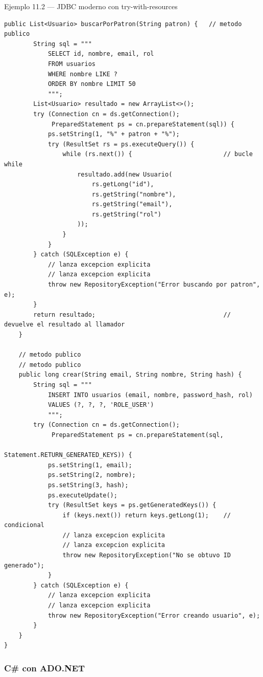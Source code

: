 \documentclass[11pt,a4paper,openany]{book}
\begin{document}
\begin{cajaejemplo}{Ejemplo 11.2 --- JDBC moderno con try-with-resources}
\begin{lstlisting}[style=java,caption={UsuarioJdbcRepository.java},label=lst:11.5]
    public List<Usuario> buscarPorPatron(String patron) {   // metodo publico
        String sql = """
            SELECT id, nombre, email, rol
            FROM usuarios
            WHERE nombre LIKE ?
            ORDER BY nombre LIMIT 50
            """;
        List<Usuario> resultado = new ArrayList<>();
        try (Connection cn = ds.getConnection();
             PreparedStatement ps = cn.prepareStatement(sql)) {
            ps.setString(1, "%" + patron + "%");
            try (ResultSet rs = ps.executeQuery()) {
                while (rs.next()) {                         // bucle while
                    resultado.add(new Usuario(
                        rs.getLong("id"),
                        rs.getString("nombre"),
                        rs.getString("email"),
                        rs.getString("rol")
                    ));
                }
            }
        } catch (SQLException e) {
            // lanza excepcion explicita
            // lanza excepcion explicita
            throw new RepositoryException("Error buscando por patron", e);
        }
        return resultado;                                   // devuelve el resultado al llamador
    }

    // metodo publico
    // metodo publico
    public long crear(String email, String nombre, String hash) {
        String sql = """
            INSERT INTO usuarios (email, nombre, password_hash, rol)
            VALUES (?, ?, ?, 'ROLE_USER')
            """;
        try (Connection cn = ds.getConnection();
             PreparedStatement ps = cn.prepareStatement(sql,
                                       Statement.RETURN_GENERATED_KEYS)) {
            ps.setString(1, email);
            ps.setString(2, nombre);
            ps.setString(3, hash);
            ps.executeUpdate();
            try (ResultSet keys = ps.getGeneratedKeys()) {
                if (keys.next()) return keys.getLong(1);    // condicional
                // lanza excepcion explicita
                // lanza excepcion explicita
                throw new RepositoryException("No se obtuvo ID generado");
            }
        } catch (SQLException e) {
            // lanza excepcion explicita
            // lanza excepcion explicita
            throw new RepositoryException("Error creando usuario", e);
        }
    }
}
\end{lstlisting}
\end{cajaejemplo}

\subsubsection{C\# con ADO.NET}
\end{document}
